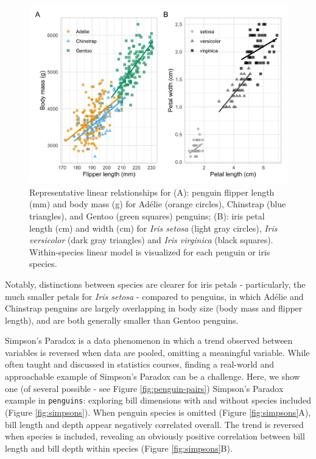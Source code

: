 \begin{Schunk}
\begin{figure}[htbp]

{\centering \includegraphics[width=\textwidth]{figs/linear-example-1} 

}

\caption[Representative linear relationships for (A)]{Representative linear relationships for (A): penguin flipper length (mm) and body mass (g) for Adélie (orange circles), Chinstrap (blue triangles), and Gentoo (green squares) penguins; (B): iris petal length (cm) and width (cm) for \textit{Iris setosa} (light gray circles), \textit{Iris versicolor} (dark gray triangles) and \textit{Iris virginica} (black squares). Within-species linear model is visualized for each penguin or iris species.}\label{fig:linear-example}
\end{figure}
\end{Schunk}

Notably, distinctions between species are clearer for iris petals -
particularly, the much smaller petals for \emph{Iris setosa} - compared
to penguins, in which Adélie and Chinstrap penguins are largely
overlapping in body size (body mass and flipper length), and are both
generally smaller than Gentoo penguins.

Simpson's Paradox is a data phenomenon in which a trend observed between
variables is reversed when data are pooled, omitting a meaningful
variable. While often taught and discussed in statistics courses,
finding a real-world and approachable example of Simpson's Paradox can
be a challenge. Here, we show one (of several possible - see Figure
\ref{fig:penguin-pairs}) Simpson's Paradox example in \texttt{penguins}:
exploring bill dimensions with and without species included (Figure
\ref{fig:simpsons}). When penguin species is omitted (Figure
\ref{fig:simpsons}A), bill length and depth appear negatively correlated
overall. The trend is reversed when species is included, revealing an
obviously positive correlation between bill length and bill depth within
species (Figure \ref{fig:simpsons}B).

